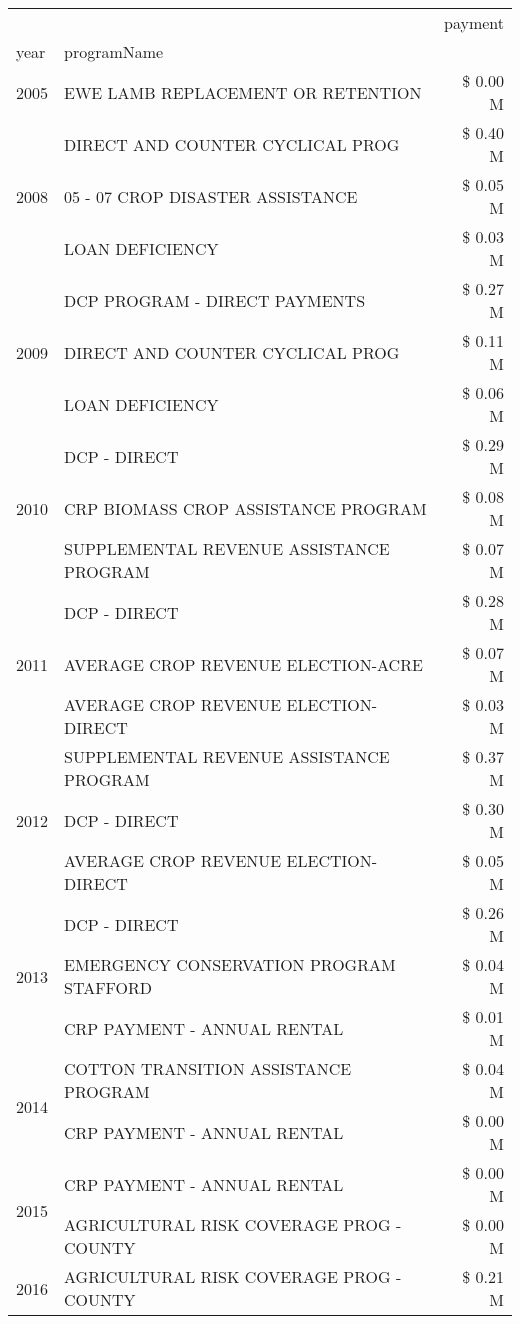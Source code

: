 \begin{tabular}{llr}
\toprule
 &  & payment \\
year & programName &  \\
\midrule
2005 & EWE LAMB REPLACEMENT OR RETENTION & \$ 0.00 M \\
\cline{1-3}
\multirow[t]{3}{*}{2008} & DIRECT AND COUNTER CYCLICAL PROG & \$ 0.40 M \\
 & 05 - 07 CROP DISASTER ASSISTANCE & \$ 0.05 M \\
 & LOAN DEFICIENCY & \$ 0.03 M \\
\cline{1-3}
\multirow[t]{3}{*}{2009} & DCP PROGRAM - DIRECT PAYMENTS & \$ 0.27 M \\
 & DIRECT AND COUNTER CYCLICAL PROG & \$ 0.11 M \\
 & LOAN DEFICIENCY & \$ 0.06 M \\
\cline{1-3}
\multirow[t]{3}{*}{2010} & DCP - DIRECT & \$ 0.29 M \\
 & CRP BIOMASS CROP ASSISTANCE PROGRAM & \$ 0.08 M \\
 & SUPPLEMENTAL REVENUE ASSISTANCE PROGRAM & \$ 0.07 M \\
\cline{1-3}
\multirow[t]{3}{*}{2011} & DCP - DIRECT & \$ 0.28 M \\
 & AVERAGE CROP REVENUE ELECTION-ACRE & \$ 0.07 M \\
 & AVERAGE CROP REVENUE ELECTION-DIRECT & \$ 0.03 M \\
\cline{1-3}
\multirow[t]{3}{*}{2012} & SUPPLEMENTAL REVENUE ASSISTANCE PROGRAM & \$ 0.37 M \\
 & DCP - DIRECT & \$ 0.30 M \\
 & AVERAGE CROP REVENUE ELECTION-DIRECT & \$ 0.05 M \\
\cline{1-3}
\multirow[t]{3}{*}{2013} & DCP - DIRECT & \$ 0.26 M \\
 & EMERGENCY CONSERVATION PROGRAM STAFFORD & \$ 0.04 M \\
 & CRP PAYMENT - ANNUAL RENTAL & \$ 0.01 M \\
\cline{1-3}
\multirow[t]{2}{*}{2014} & COTTON TRANSITION ASSISTANCE PROGRAM & \$ 0.04 M \\
 & CRP PAYMENT - ANNUAL RENTAL & \$ 0.00 M \\
\cline{1-3}
\multirow[t]{2}{*}{2015} & CRP PAYMENT - ANNUAL RENTAL & \$ 0.00 M \\
 & AGRICULTURAL RISK COVERAGE PROG - COUNTY & \$ 0.00 M \\
\cline{1-3}
\multirow[t]{3}{*}{2016} & AGRICULTURAL RISK COVERAGE PROG - COUNTY & \$ 0.21 M \\

\end{tabular}
